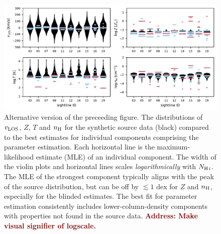 \documentclass[fleqn,usenatbib]{mnras}
\newcommand{\todo}[1]{\textcolor{Maroon}{\textbf{Address: #1}}}
\begin{document}
\begin{figure}
    \centering
    \includegraphics[width=\textwidth]{figures/sample2/violin_vs_components_alternate.pdf}
    \caption{
    Alternative version of the preceeding figure.
    The distributions of $v_{\rm LOS}$, $Z$, $T$ and $n_{\rm H}$ for the synthetic source data (black) compared to the best estimates for individual components comprising the parameter estimation.
    Each horizontal line is the maximum-likelihood estimate (MLE) of an individual component.
    The width of the violin plots and horizontal lines scales \textit{logarithmically} with $N_{\ion{H}{I}}$.
    The MLE of the strongest component typically aligns with the peak of the source distribution, but can be off by $\lesssim 1$ dex for $Z$ and $n_{\rm H}$, especially for the blinded estimates.
    The best fit for parameter estimation consistently includes lower-column-density components with properties not found in the source data.
    \todo{Make visual signifier of logscale.}
    }
    \label{f: sample2 violin vs components alt}
\end{figure}



\end{document}
